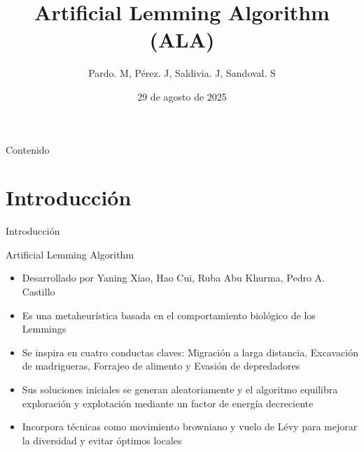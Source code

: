 \documentclass[12pt]{beamer}
\title{Artificial Lemming Algorithm (ALA)}
\author{Pardo. M, Pérez. J, Saldivia. J, Sandoval. S}
\date{29 de agosto de 2025}
\begin{document}
\begin{frame}
  \titlepage
\end{frame}

\begin{frame}{Contenido}
  \tableofcontents %
\end{frame}

\section{Introducción}

\begin{frame}{Introducción}
  \begin{block}{Artificial Lemming Algorithm}
      \justifying
      \begin{itemize}
          \item Desarrollado por  Yaning Xiao, Hao Cui, Ruba Abu Khurma, Pedro A. Castillo
          \item Es una metaheurística basada en el comportamiento biológico de los Lemmings
          \item Se inspira en cuatro conductas claves: Migración a larga distancia, Excavación de madrigueras, Forrajeo de alimento y Evasión de depredadores
          \item Sus soluciones iniciales se generan aleatoriamente y el algoritmo equilibra exploración y explotación mediante un factor de energía decreciente
          \item Incorpora técnicas como movimiento browniano y vuelo de Lévy para mejorar la diversidad y evitar óptimos locales
          
      \end{itemize}
      
  \end{block}
\end{frame}
\end{document}
